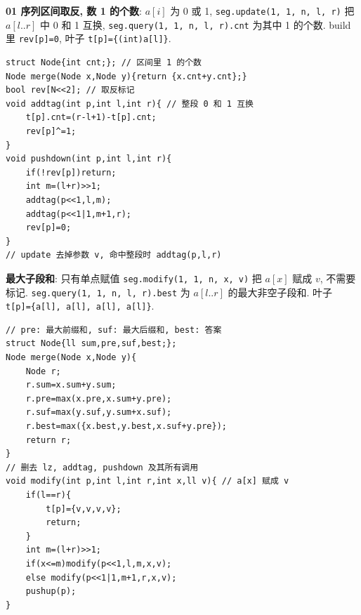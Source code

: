 \begin{compactitem}
\item \textbf{01 序列区间取反, 数 1 的个数}: $a[i]$ 为 0 或 1, \texttt{seg.update(1, 1, n, l, r)} 把 $a[l..r]$ 中 0 和 1 互换, \texttt{seg.query(1, 1, n, l, r).cnt} 为其中 1 的个数. build 里 \texttt{rev[p]=0}, 叶子 \texttt{t[p]=\{(int)a[l]\}}.
\begin{lstlisting}
struct Node{int cnt;}; // 区间里 1 的个数
Node merge(Node x,Node y){return {x.cnt+y.cnt};}
bool rev[N<<2]; // 取反标记
void addtag(int p,int l,int r){ // 整段 0 和 1 互换
	t[p].cnt=(r-l+1)-t[p].cnt;
	rev[p]^=1;
}
void pushdown(int p,int l,int r){
	if(!rev[p])return;
	int m=(l+r)>>1;
	addtag(p<<1,l,m);
	addtag(p<<1|1,m+1,r);
	rev[p]=0;
}
// update 去掉参数 v, 命中整段时 addtag(p,l,r)
\end{lstlisting}
\item \textbf{最大子段和}: 只有单点赋值 \texttt{seg.modify(1, 1, n, x, v)} 把 $a[x]$ 赋成 $v$, 不需要标记. \texttt{seg.query(1, 1, n, l, r).best} 为 $a[l..r]$ 的最大非空子段和. 叶子 \texttt{t[p]=\{a[l], a[l], a[l], a[l]\}}.
\begin{lstlisting}
// pre: 最大前缀和, suf: 最大后缀和, best: 答案
struct Node{ll sum,pre,suf,best;};
Node merge(Node x,Node y){
	Node r;
	r.sum=x.sum+y.sum;
	r.pre=max(x.pre,x.sum+y.pre);
	r.suf=max(y.suf,y.sum+x.suf);
	r.best=max({x.best,y.best,x.suf+y.pre});
	return r;
}
// 删去 lz, addtag, pushdown 及其所有调用
void modify(int p,int l,int r,int x,ll v){ // a[x] 赋成 v
	if(l==r){
		t[p]={v,v,v,v};
		return;
	}
	int m=(l+r)>>1;
	if(x<=m)modify(p<<1,l,m,x,v);
	else modify(p<<1|1,m+1,r,x,v);
	pushup(p);
}
\end{lstlisting}
\end{compactitem}
\endgroup
{}
